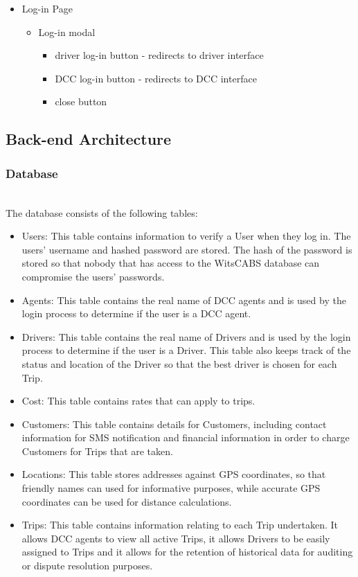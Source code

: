 \documentclass[10pt, onecolumn]{witseiepaper}
\begin{document}
\begin{itemize}
\begin{itemize}
\begin{itemize}
\end{itemize}
\end{itemize}
\item Log-in Page
\begin{itemize}
\item Log-in modal
\begin{itemize}
\item driver log-in button - redirects to driver interface
\item DCC log-in button - redirects to DCC interface
\item close button\\
\end{itemize}
\end{itemize}
\end{itemize}


\subsection{Back-end Architecture}
\subsubsection{Database}\mbox{}\\
The database consists of the following tables:
\begin{itemize}
\item Users: This table contains information to verify a User when they log in. The users' username and hashed password are stored. The hash of the password is stored so that nobody that has access to the WitsCABS database can compromise the users' passwords.
\item Agents: This table contains the real name of DCC agents and is used by the login process to determine if the user is a DCC agent.
\item Drivers: This table contains the real name of Drivers and is used by the login process to determine if the user is a Driver. This table also keeps track of the status and location of the Driver so that the best driver is chosen for each Trip.
\item Cost: This table contains rates that can apply to trips.
\item Customers: This table contains details for Customers, including contact information for SMS notification and financial information in order to charge Customers for Trips that are taken.
\item Locations: This table stores addresses against GPS coordinates, so that friendly names can used for informative purposes, while accurate GPS coordinates can be used for distance calculations.
\item Trips: This table contains information relating to each Trip undertaken. It allows DCC agents to view all active Trips, it allows Drivers to be easily assigned to Trips and it allows for the retention of historical data for auditing or dispute resolution purposes.
\end{itemize}
\end{document}
